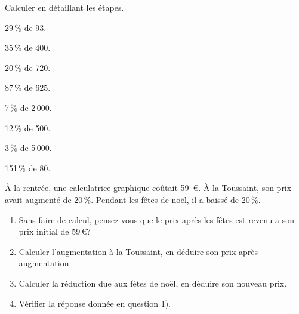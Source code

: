 \begin{colonne*exercice}
\begin{exercice} %
   Calculer en détaillant les étapes.
   \begin{colenumerate}{2}
      \item 29\,\% de 93.
      \item 35\,\% de 400.
      \item 20\,\% de 720.
      \item 87\,\% de 625.
      \item 7\,\% de 2\,000.
      \item 12\,\% de 500.
      \item 3\,\% de 5\,000.
      \item 151\,\% de 80. \\
   \end{colenumerate}
\end{exercice}


\begin{exercice} %
   À la rentrée, une calculatrice graphique coûtait 59~\euro. À la Toussaint, son prix avait augmenté de 20\,\%. Pendant les fêtes de noël, il a baissé de 20\,\%.
   \begin{enumerate}
      \item Sans faire de calcul, pensez-vous que le prix après les fêtes est revenu a son prix initial de 59\,\euro ?
      \item Calculer l'augmentation à la Toussaint, en déduire son prix après augmentation.
      \item Calculer la réduction due aux fêtes de noël, en déduire son nouveau prix.
      \item Vérifier la réponse donnée en question 1).
\end{enumerate}
\end{exercice}





\end{colonne*exercice}

